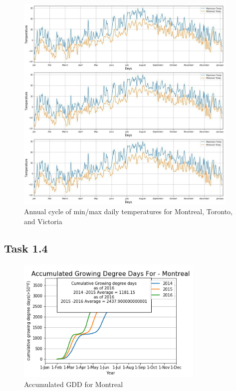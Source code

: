 \documentclass[12pt]{article}
\begin{document}
\begin{figure}[!htbp]
\centering
\includegraphics[width=0.95\textwidth]{./docs/maxmins_all.jpg} 
\caption{\scriptsize Annual cycle of min/max daily temperatures for Montreal, Toronto, and Victoria}
\label{minmax_all}		  
\end{figure}


\pagebreak
\subsection{Task 1.4}	

\begin{figure}[!htbp]
\centering
\includegraphics[width=0.8\textwidth]{./docs/MontrealGDD.png} 
\caption{\scriptsize Accumulated GDD for Montreal}
\label{accuGDD_1}		  
\end{figure}
\end{document}
